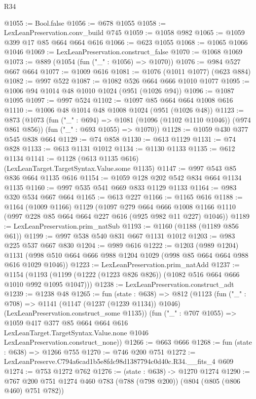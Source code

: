 \begin{lexlean}{R34}
\begin{coremodule}
@1055 := Bool.false
@1056 := @678 @1055
@1058 := LexLeanPreservation.conv_build @745
@1059 := @1058 @982
@1065 := @1059 @399 @17 @85 @664 @664 @616
@1066 := @623 @1055
@1068 := @1065 @1066 @1046
@1069 := LexLeanPreservation.construct_false
@1070 := @1068 @1069
@1073 := @889 (@1054 (fun ("_" : @1056) => @1070))
@1076 := @984 @527 @667 @664
@1077 := @1009 @616
@1081 := @1076 (@1011 @1077) (@623 @884)
@1082 := @997 @522
@1087 := @1082 @526 @664 @666 @1010 @1077
@1095 := @1006 @94 @1014 @48 @1010 @1024 (@951 (@1026 @94))
@1096 := @1087 @1095
@1097 := @997 @524
@1102 := @1097 @85 @664 @664 @1008 @616
@1110 := @1006 @48 @1014 @48 @1008 @1024 (@951 (@1026 @48))
@1123 := @873
    (@1073
      (fun ("_" : @694) => @1081 (@1096 (@1102 @1110 @1046)) (@974 @861 @856))
      (fun ("_" : @693 @1055) => @1070))
@1128 := @1059 @430 @377 @545 @838 @664
@1129 := @74 @858
@1130 := @613 @1129
@1131 := @74 @828
@1133 := @613 @1131 @1012
@1134 := @1130 @1133
@1135 := @612 @1134
@1141 := @1128 (@613 @1135 @616) (LexLeanTarget.TargetSyntax.Value.some @1135)
@1147 := @997 @543 @85 @836 @664 @1135 @616
@1154 := @1059 @128 @202 @542 @834 @664 @1134 @1135
@1160 := @997 @535 @541 @669 @833 @1129 @1133
@1164 := @983 @320 @534 @667 @664
@1165 := @613 @227
@1166 := @1165 @616
@1188 := @1164
    (@1009 @1166)
    @1129
    (@1097
      @279
      @664
      @666
      @1008
      @1166
      @1110
      (@997 @228 @85 @664 @664 @227 @616 (@925 @982 @11 @227) @1046))
@1189 := LexLeanPreservation.prim_natSub
@1193 := @1160 (@1188 (@1189 @856 @61))
@1199 := @997 @538 @540 @831 @667 @1131 @1012
@1203 := @983 @225 @537 @667 @830
@1204 := @989 @616
@1222 := @1203
    (@989 @1204)
    @1131
    (@998 @510 @664 @666 @988 @1204 @1029 (@998 @85 @664 @664 @988 @616 @1029 @1046))
@1223 := LexLeanPreservation.prim_natAdd
@1237 := @1154
    (@1193 (@1199 (@1222 (@1223 @826 @826)) (@1082 @516 @664 @666 @1010 @992 @1095 @1047)))
@1238 := LexLeanPreservation.construct_adt
@1239 := @1238 @48
@1265 := fun (state : @638) =>
  @812
    (@1123
      (fun ("_" : @708) =>
      @1141 (@1147 (@1237 (@1239 @1134)) @1046) (LexLeanPreservation.construct_some @1135))
      (fun ("_" : @707 @1055) =>
      @1059
        @417
        @377
        @85
        @664
        @664
        @616
        LexLeanTarget.TargetSyntax.Value.none
        @1046
        LexLeanPreservation.construct_none))
@1266 := @663 @666
@1268 := fun (state : @638) => @1266 @755
@1270 := @746 @200 @751
@1272 := LexLeanPreserve.C794a6cad1b5e8fdc98d1387794c0d40c.R34.__fits_4 @609
@1274 := @753 @1272 @762
@1276 := (state : @638) -> @1270 @1274
@1290 := @767 @200 @751 @1274 @460 @783 (@788 (@798 @200)) (@804 (@805 (@806 @460) @751 @782))

\end{coremodule}
\end{lexlean}
